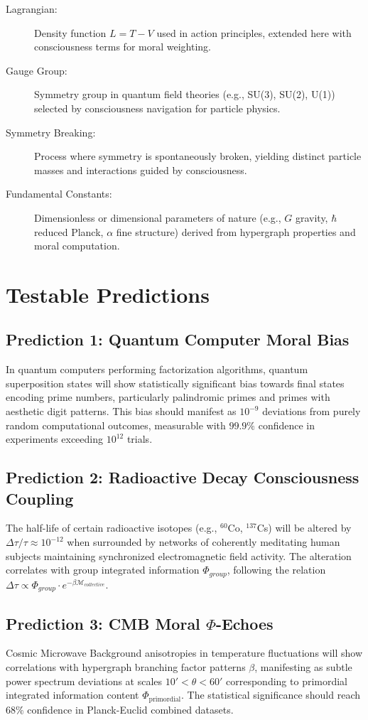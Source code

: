 \documentclass[12pt,a4paper]{article}
\theoremstyle{definition}
\begin{document}
\begin{description}
    \item[Lagrangian:] Density function $L = T - V$ used in action principles, extended here with consciousness terms for moral weighting.
    \item[Gauge Group:] Symmetry group in quantum field theories (e.g., SU(3), SU(2), U(1)) selected by consciousness navigation for particle physics.
    \item[Symmetry Breaking:] Process where symmetry is spontaneously broken, yielding distinct particle masses and interactions guided by consciousness.
    \item[Fundamental Constants:] Dimensionless or dimensional parameters of nature (e.g., $G$ gravity, $\hbar$ reduced Planck, $\alpha$ fine structure) derived from hypergraph properties and moral computation.
\end{description}

\section{Testable Predictions}

\subsection{Prediction 1: Quantum Computer Moral Bias}
In quantum computers performing factorization algorithms, quantum superposition states will show statistically significant bias towards final states encoding prime numbers, particularly palindromic primes and primes with aesthetic digit patterns. This bias should manifest as $10^{-9}$ deviations from purely random computational outcomes, measurable with $99.9\%$ confidence in experiments exceeding $10^{12}$ trials.

\subsection{Prediction 2: Radioactive Decay Consciousness Coupling}
The half-life of certain radioactive isotopes (e.g., $^{60}$Co, $^{137}$Cs) will be altered by $\Delta \tau / \tau \approx 10^{-12}$ when surrounded by networks of coherently meditating human subjects maintaining synchronized electromagnetic field activity. The alteration correlates with group integrated information $\Phi_{group}$, following the relation $\Delta \tau \propto \Phi_{group} \cdot e^{-\beta \mathcal{M}_{collective}}$.

\subsection{Prediction 3: CMB Moral $\Phi$-Echoes}
Cosmic Microwave Background anisotropies in temperature fluctuations will show correlations with hypergraph branching factor patterns $\beta$, manifesting as subtle power spectrum deviations at scales $10' < \theta < 60'$ corresponding to primordial integrated information content $\Phi_{\text{primordial}}$. The statistical significance should reach $68\%$ confidence in Planck-Euclid combined datasets.
\end{document}
